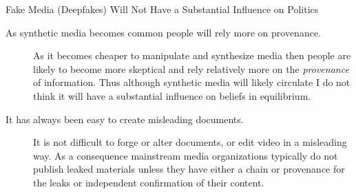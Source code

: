 \documentclass[
  10pt,
  ignorenonframetext,
]{beamer}
\begin{document}
\begin{frame}{}
\label{section-11}
\end{frame}

\begin{frame}{Fake Media (Deepfakes) Will Not Have a Substantial
Influence on Politics}
\label{fake-media-deepfakes-will-not-have-a-substantial-influence-on-politics}
\begin{description}
\item[As synthetic media becomes common people will rely more on
provenance.]
As it becomes cheaper to manipulate and synthesize media then people are
likely to become more skeptical and rely relatively more on the
\emph{provenance} of information. Thus although synthetic media will
likely circulate I do not think it will have a substantial influence on
beliefs in equilibrium.
\item[It has always been easy to create misleading documents.]
It is not difficult to forge or alter documents, or edit video in a
misleading way. As a consequence mainstream media organizations
typically do not publish leaked materials unless they have either a
chain or provenance for the leaks or independent confirmation of their
content.
\end{description}
\end{frame}
\end{document}
